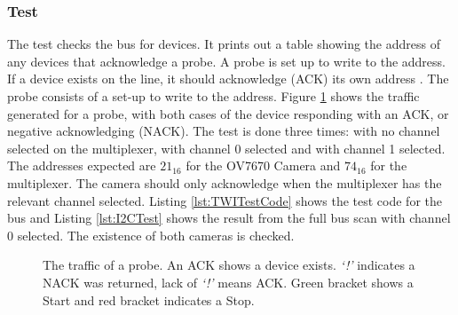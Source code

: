 \subsubsection{\itc Test}\label{I2C:Test}
The \itc test checks the bus for devices. It prints out a table showing the address of any devices that acknowledge a probe. A probe is set up to write to the address. If a device exists on the line, it should acknowledge (ACK) its own address \citep{Philips:I2C}. The probe consists of a set-up to write to the address. Figure \ref{fig:I2C} shows the \itc traffic generated for a probe, with both cases of the device responding with an ACK, or negative acknowledging (NACK). The test is done three times: with no channel selected on the \itc multiplexer, with channel 0 selected and with channel 1 selected. The addresses expected are $21_{16}$ for the OV7670 Camera and $74_{16}$ for the \itc multiplexer. The camera should only acknowledge when the \itc multiplexer has the relevant channel selected. Listing \ref{lst:TWITestCode} shows the test code for the \itc bus and Listing \ref{lst:I2CTest} shows the result from the full bus scan with channel 0 selected. The existence of both cameras is checked. %
\begin{figure}
\caption{The \itc traffic of a probe. An ACK shows a device exists. \textit{`!'} indicates a NACK was returned, lack of \textit{`!'} means ACK. Green bracket shows a Start and red bracket indicates a Stop.}
\label{fig:I2C}
\end{figure}



